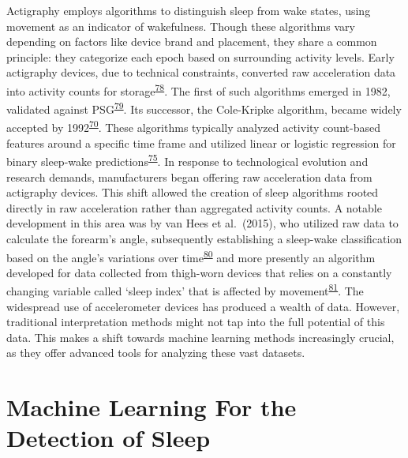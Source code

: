 \documentclass[
  10pt,
]{scrbook}
\begin{document}
Actigraphy employs algorithms to distinguish sleep from wake states,
using movement as an indicator of wakefulness. Though these algorithms
vary depending on factors like device brand and placement, they share a
common principle: they categorize each epoch based on surrounding
activity levels. Early actigraphy devices, due to technical constraints,
converted raw acceleration data into activity counts for
storage\textsuperscript{\protect\hyperlink{ref-neishabouri_2022}{78}}.
The first of such algorithms emerged in 1982, validated against
PSG\textsuperscript{\protect\hyperlink{ref-webster_activity-based_1982}{79}}.
Its successor, the Cole-Kripke algorithm, became widely accepted by
1992\textsuperscript{\protect\hyperlink{ref-cole_automatic_1992}{70}}.
These algorithms typically analyzed activity count-based features around
a specific time frame and utilized linear or logistic regression for
binary sleep-wake
predictions\textsuperscript{\protect\hyperlink{ref-sazonov_activity-based_2004}{75}}.
In response to technological evolution and research demands,
manufacturers began offering raw acceleration data from actigraphy
devices. This shift allowed the creation of sleep algorithms rooted
directly in raw acceleration rather than aggregated activity counts. A
notable development in this area was by van Hees et al.~(2015), who
utilized raw data to calculate the forearm's angle, subsequently
establishing a sleep-wake classification based on the angle's variations
over time\textsuperscript{\protect\hyperlink{ref-hees_novel_2015}{80}}
and more presently an algorithm developed for data collected from
thigh-worn devices that relies on a constantly changing variable called
`sleep index' that is affected by
movement\textsuperscript{\protect\hyperlink{ref-johansson_development_2023}{81}}.
The widespread use of accelerometer devices has produced a wealth of
data. However, traditional interpretation methods might not tap into the
full potential of this data. This makes a shift towards machine learning
methods increasingly crucial, as they offer advanced tools for analyzing
these vast datasets.

\hypertarget{machine-learning-for-the-detection-of-sleep}{%
\section{Machine Learning For the Detection of
Sleep}\label{machine-learning-for-the-detection-of-sleep}}
\end{document}
